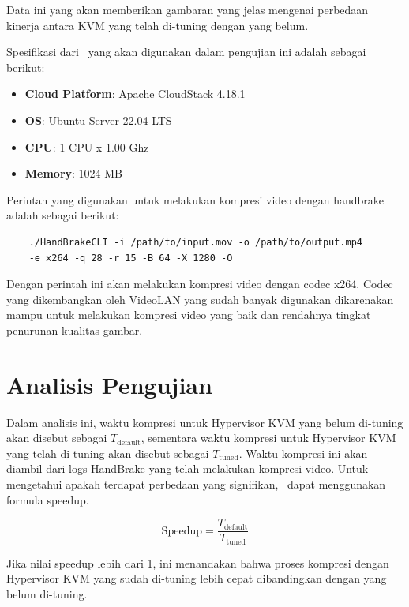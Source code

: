     Data ini yang akan memberikan gambaran yang jelas mengenai perbedaan kinerja antara KVM yang telah di-tuning dengan yang belum.

    Spesifikasi dari \vm\ yang akan digunakan dalam pengujian ini adalah sebagai berikut:
    \begin{itemize}
        \item \textbf{Cloud Platform}: Apache CloudStack 4.18.1
        \item \textbf{OS}: Ubuntu Server 22.04 LTS
        \item \textbf{CPU}: 1 CPU x 1.00 Ghz
        \item \textbf{Memory}: 1024 MB
    \end{itemize}

    Perintah yang digunakan untuk melakukan kompresi video dengan handbrake adalah sebagai berikut:

    \begin{verbatim}
    ./HandBrakeCLI -i /path/to/input.mov -o /path/to/output.mp4
    -e x264 -q 28 -r 15 -B 64 -X 1280 -O
\end{verbatim}

    Dengan perintah ini \saya akan melakukan kompresi video dengan codec x264. Codec yang dikembangkan oleh VideoLAN yang sudah banyak digunakan dikarenakan mampu untuk melakukan kompresi video yang baik dan rendahnya tingkat penurunan kualitas gambar.

    \section{Analisis Pengujian}
    Dalam analisis ini, waktu kompresi untuk Hypervisor KVM yang belum di-tuning akan disebut sebagai $T_{\mathrm{default}}$, sementara waktu kompresi untuk Hypervisor KVM yang telah di-tuning akan disebut sebagai $T_{\mathrm{tuned}}$. Waktu kompresi ini akan diambil dari logs HandBrake yang telah melakukan kompresi video. Untuk mengetahui apakah terdapat perbedaan yang signifikan, \saya\ dapat menggunakan formula speedup.

    \[ \mathrm{Speedup} = \frac{T_{\mathrm{default}}}{T_{\mathrm{tuned}}} \]

    Jika nilai speedup lebih dari 1, ini menandakan bahwa proses kompresi dengan Hypervisor KVM yang sudah di-tuning lebih cepat dibandingkan dengan yang belum di-tuning.


